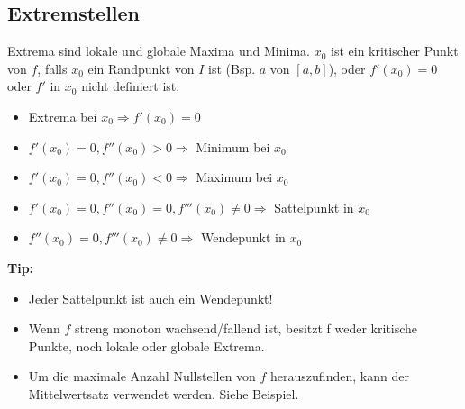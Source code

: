 


\subsection{Extremstellen}
Extrema sind lokale und globale Maxima und Minima. $x_0$ ist ein kritischer Punkt von $f$, falls $x_0$ ein Randpunkt von $I$ ist (Bsp. $a$ von $[a, b]$), oder $f'(x_0) = 0$ oder $f'$ in $x_0$ nicht definiert ist.
\begin{itemize}
	\item Extrema bei $x_0 \Rightarrow f'(x_0) = 0$
	\item $f'(x_0) = 0, f''(x_0) > 0 \Rightarrow$ Minimum bei $x_0$
	\item $f'(x_0) = 0, f''(x_0) < 0 \Rightarrow$ Maximum bei $x_0$
	\item $f'(x_0) = 0, f''(x_0) = 0, f'''(x_0) \neq 0 \Rightarrow$ Sattelpunkt in $x_0$
	\item \hspace{1.6cm} $f''(x_0) = 0, f'''(x_0) \neq 0 \Rightarrow$ Wendepunkt in $x_0$
\end{itemize}
\textbf{Tip:}
\begin{itemize}
	\item Jeder Sattelpunkt ist auch ein Wendepunkt!
	\item Wenn $f$ streng monoton wachsend/fallend ist, besitzt f weder kritische Punkte, noch lokale oder globale Extrema.
	\item Um die maximale Anzahl Nullstellen von $f$ herauszufinden, kann der Mittelwertsatz verwendet werden. Siehe Beispiel.
\end{itemize}



